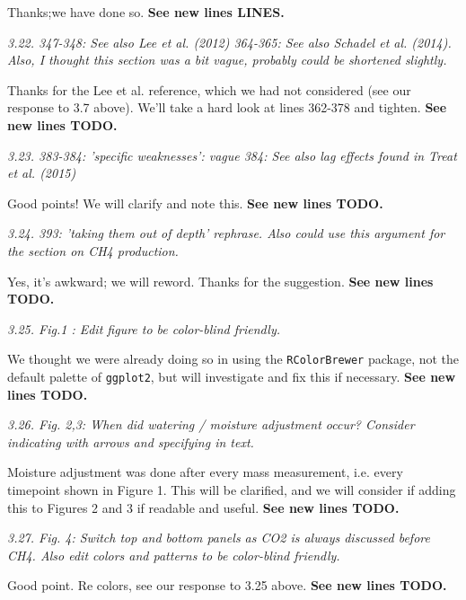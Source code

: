 \documentclass[11pt, oneside]{article}
\begin{document}
Thanks;we have done so. {\bf See new lines LINES.}

\medskip
{\it 3.22. 347-348: See also Lee et al. (2012)
364-365: See also Schadel et al. (2014). Also, I thought this section was a bit vague, probably could be shortened slightly. }

Thanks for the Lee et al. reference, which we had not considered (see our response to 3.7 above). We'll take a hard look at lines 362-378 and tighten. {\bf See new lines TODO.}

\medskip
{\it 3.23. 383-384: 'specific weaknesses': vague
384: See also lag effects found in Treat et al. (2015) }

Good points! We will clarify and note this. {\bf See new lines TODO.}

\medskip
{\it 3.24. 393: 'taking them out of depth' rephrase. Also could use this argument for the section on CH4 production. }

Yes, it's awkward; we will reword. Thanks for the suggestion. {\bf See new lines TODO.}

\medskip
{\it 3.25. Fig.1 : Edit figure to be color-blind friendly. }

We thought we were already doing so in using the {\tt RColorBrewer} package, not the default palette of {\tt ggplot2}, but will investigate and fix this if necessary. {\bf See new lines TODO.}

\medskip
{\it 3.26. Fig. 2,3: When did watering / moisture adjustment occur? Consider indicating with arrows and specifying in text. }

Moisture adjustment was done after every mass measurement, i.e. every timepoint shown in Figure 1. This will be clarified, and we will consider if adding this to Figures 2 and 3 if readable and useful. {\bf See new lines TODO.}

\medskip
{\it 3.27. Fig. 4: Switch top and bottom panels as CO2 is always discussed before CH4. Also edit colors and patterns to be color-blind friendly. }

Good point. Re colors, see our response to 3.25 above. {\bf See new lines TODO.}
\end{document}

